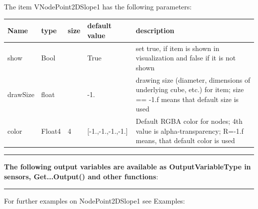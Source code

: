 The item VNodePoint2DSlope1 has the following parameters:\vspace{-1cm}\\ 
\begin{center}
  \footnotesize
  \begin{longtable}{| p{4.5cm} | p{2.5cm} | p{0.5cm} | p{2.5cm} | p{6cm} |}
    \hline
    \bf Name & \bf type & \bf size & \bf default value & \bf description \\ \hline
    show &     Bool &      &     True &     set true, if item is shown in visualization and false if it is not shown\\ \hline
    drawSize &     float &      &     -1. &     drawing size (diameter, dimensions of underlying cube, etc.)  for item; size == -1.f means that default size is used\\ \hline
    color &     Float4 &     4 &     [-1.,-1.,-1.,-1.] &     Default RGBA color for nodes; 4th value is alpha-transparency; R=-1.f means, that default color is used\\ \hline
	  \end{longtable}
	\end{center}
\par\noindent\rule{\textwidth}{0.4pt}
\label{description_NodePoint2DSlope1}
{\bf The following output variables are available as OutputVariableType in sensors, Get...Output() and other functions}: 
\finishTable
\vspace{6pt}\par\noindent\rule{\textwidth}{0.4pt}
%
\noindent For further examples on NodePoint2DSlope1 see Examples:
\bi
